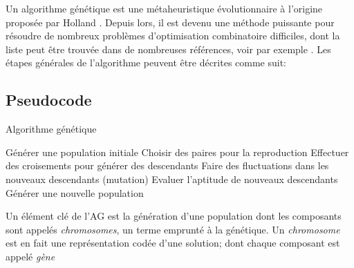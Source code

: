 \documentclass{article}
\begin{document}
Un algorithme génétique est une métaheuristique évolutionnaire à l'origine proposée par Holland \cite{holland1975adaptation}. Depuis lors, il est devenu une méthode puissante pour résoudre de nombreux problèmes d'optimisation combinatoire difficiles, dont la liste peut être trouvée dans de nombreuses références, voir par exemple \cite{cheng2000genetic}. Les étapes générales de l'algorithme peuvent être décrites comme suit:
\newline
\subsection{Pseudocode}
\begin{algorithm}[H]
	\caption{Algorithme génétique}
	\begin{algorithmic}
		\STATE Générer une population initiale\;
			\STATE Choisir des paires pour la reproduction\;
			\STATE Effectuer des croisements pour générer des descendants\;
			\STATE Faire des fluctuations dans les nouveaux descendants (mutation)\;
			\STATE Evaluer l'aptitude de nouveaux descendants\;
			\STATE Générer une nouvelle population\;
		\ENDWHILE
	\end{algorithmic}
\end{algorithm}

Un élément clé de l'AG est la génération d'une population dont les composants sont appelés \textit{chromosomes}, un terme emprunté à la génétique. Un \textit{chromosome} est en fait une représentation codée d'une solution; dont chaque composant est appelé \textit{gène}
\end{document}
